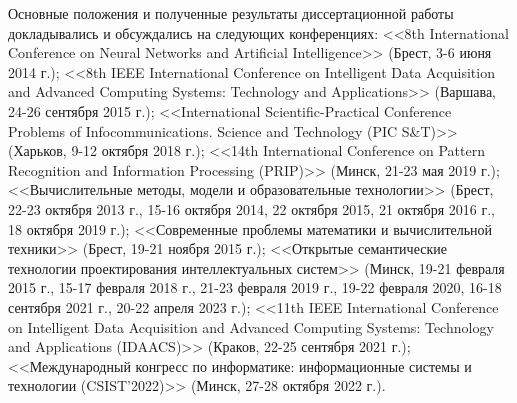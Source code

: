 Основные положения и полученные результаты диссертационной работы докладывались и обсуждались на следующих конференциях: <<8th International Conference on Neural Networks and Artificial Intelligence>> (Брест, 3-6 июня 2014 г.); <<8th IEEE International Conference on Intelligent Data Acquisition and Advanced Computing Systems: Technology and Applications>> (Варшава, 24-26 сентября 2015 г.); <<International Scientific-Practical Conference Problems of Infocommunications. Science and Technology (PIC S\&T)>> (Харьков, 9-12 октября 2018 г.); <<14th International Conference on Pattern Recognition and Information Processing (PRIP)>> (Минск, 21-23 мая 2019 г.); <<Вычислительные методы, модели и образовательные технологии>> (Брест, 22-23 октября 2013 г., 15-16 октября 2014, 22 октября 2015, 21 октября 2016 г., 18 октября 2019 г.); <<Современные проблемы математики и вычислительной техники>> (Брест, 19-21 ноября 2015 г.); <<Открытые семантические технологии проектирования интеллектуальных систем>> (Минск, 19-21 февраля 2015 г., 15-17 февраля 2018 г., 21-23 февраля 2019 г., 19-22 февраля 2020, 16-18 сентября 2021 г., 20-22 апреля 2023 г.); <<11th IEEE International Conference on Intelligent Data Acquisition and Advanced Computing Systems: Technology and Applications (IDAACS)>> (Краков, 22-25 сентября 2021 г.); <<Международный конгресс по информатике: информационные системы и технологии (CSIST'2022)>> (Минск, 27-28 октября 2022 г.).


